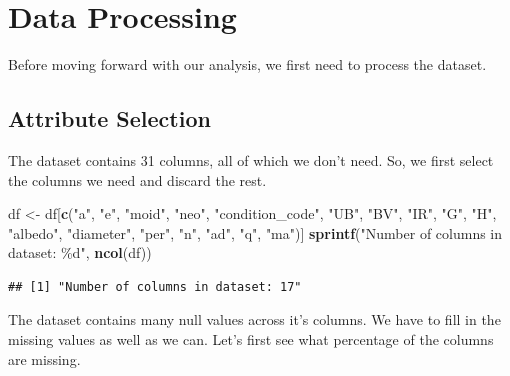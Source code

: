 \documentclass[
]{article}
\newenvironment{Shaded}{\begin{snugshade}}{\end{snugshade}}
\newcommand{\FunctionTok}[1]{\textcolor[rgb]{0.13,0.29,0.53}{\textbf{#1}}}
\newcommand{\NormalTok}[1]{#1}
\newcommand{\OtherTok}[1]{\textcolor[rgb]{0.56,0.35,0.01}{#1}}
\newcommand{\StringTok}[1]{\textcolor[rgb]{0.31,0.60,0.02}{#1}}
\begin{document}
\hypertarget{data-processing}{%
\section{Data Processing}\label{data-processing}}

Before moving forward with our analysis, we first need to process the
dataset.

\hypertarget{attribute-selection}{%
\subsection{Attribute Selection}\label{attribute-selection}}

The dataset contains 31 columns, all of which we don't need. So, we
first select the columns we need and discard the rest.

\begin{Shaded}
\begin{Highlighting}[]
\NormalTok{df }\OtherTok{\textless{}{-}}\NormalTok{ df[}\FunctionTok{c}\NormalTok{(}\StringTok{"a"}\NormalTok{, }\StringTok{"e"}\NormalTok{, }\StringTok{"moid"}\NormalTok{, }\StringTok{"neo"}\NormalTok{, }\StringTok{"condition\_code"}\NormalTok{, }\StringTok{"UB"}\NormalTok{, }\StringTok{"BV"}\NormalTok{, }\StringTok{"IR"}\NormalTok{, }\StringTok{"G"}\NormalTok{, }\StringTok{"H"}\NormalTok{,}
           \StringTok{"albedo"}\NormalTok{, }\StringTok{"diameter"}\NormalTok{, }\StringTok{"per"}\NormalTok{, }\StringTok{"n"}\NormalTok{, }\StringTok{"ad"}\NormalTok{, }\StringTok{"q"}\NormalTok{, }\StringTok{"ma"}\NormalTok{)]}
\FunctionTok{sprintf}\NormalTok{(}\StringTok{"Number of columns in dataset: \%d"}\NormalTok{, }\FunctionTok{ncol}\NormalTok{(df))}
\end{Highlighting}
\end{Shaded}

\begin{verbatim}
## [1] "Number of columns in dataset: 17"
\end{verbatim}

The dataset contains many null values across it's columns. We have to
fill in the missing values as well as we can. Let's first see what
percentage of the columns are missing.
\end{document}
